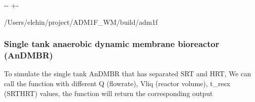 \documentclass[a4paper,10pt,english]{sphinxmanual}
\newlength\nbsphinxcodecellspacing
\begin{document}
{
\begin{sphinxVerbatim}[commandchars=\\\{\}]
\llap{\color{nbsphinxin}[3]:\,\hspace{\fboxrule}\hspace{\fboxsep}}
\end{sphinxVerbatim}
}

{
\begin{sphinxVerbatim}[commandchars=\\\{\}]
\llap{\color{nbsphinxin}[4]:\,\hspace{\fboxrule}\hspace{\fboxsep}}
 
\end{sphinxVerbatim}
}

{

\kern-\sphinxverbatimsmallskipamount\kern-\baselineskip
\kern+\FrameHeightAdjust\kern-\fboxrule
\vspace{\nbsphinxcodecellspacing}

\begin{sphinxVerbatim}[commandchars=\\\{\}]
/Users/elchin/project/ADM1F\_WM/build/adm1f
\end{sphinxVerbatim}
}


\subsubsection{Single tank anaerobic dynamic membrane bioreactor (AnDMBR)}
\label{\detokenize{jupyter_notebook/ADM1F_SRT_2phase:Single-tank-anaerobic-dynamic-membrane-bioreactor-(AnDMBR)}}
\sphinxAtStartPar
To simulate the single tank AnDMBR that has separated SRT and HRT, We can call the function with different Q (flow\sphinxhyphen{}rate), Vliq (reactor volume), t\_resx (SRT\sphinxhyphen{}HRT) values, the function will return the corresponding output
\end{document}
